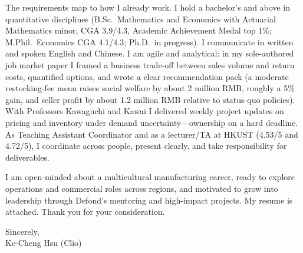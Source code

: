 \documentclass[11pt,letterpaper]{article}
\begin{document}
The requirements map to how I already work. I hold a bachelor's and above in quantitative disciplines (B.Sc.\ Mathematics and Economics with Actuarial Mathematics minor, CGA 3.9/4.3, Academic Achievement Medal top 1\%; M.Phil.\ Economics CGA 4.1/4.3; Ph.D.\ in progress). I communicate in written and spoken English and Chinese. I am agile and analytical: in my sole-authored job market paper I framed a business trade-off between sales volume and return costs, quantified options, and wrote a clear recommendation pack (a moderate restocking-fee menu raises social welfare by about 2 million RMB, roughly a 5\% gain, and seller profit by about 1.2 million RMB relative to status-quo policies). With Professors Kawaguchi and Kawai I delivered weekly project updates on pricing and inventory under demand uncertainty---ownership on a hard deadline. As Teaching Assistant Coordinator and as a lecturer/TA at HKUST (4.53/5 and 4.72/5), I coordinate across people, present clearly, and take responsibility for deliverables.

I am open-minded about a multicultural manufacturing career, ready to explore operations and commercial roles across regions, and motivated to grow into leadership through Defond's mentoring and high-impact projects. My resume is attached. Thank you for your consideration.

\vspace{0.35em}
Sincerely,\\[0.3em]
Ke-Cheng Hsu (Clio)
\end{document}
